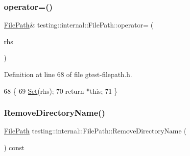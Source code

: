 \mbox{\label{classtesting_1_1internal_1_1FilePath_a8d9c1bafb90f10bcd5611a54d8f326ef}} 
\subsubsection{\texorpdfstring{operator=()}{operator=()}}
{\footnotesize\ttfamily \hyperlink{classtesting_1_1internal_1_1FilePath}{File\+Path}\& testing\+::internal\+::\+File\+Path\+::operator= (\begin{DoxyParamCaption}\item[{const \hyperlink{classtesting_1_1internal_1_1FilePath}{File\+Path} \&}]{rhs }\end{DoxyParamCaption})\hspace{0.3cm}{\ttfamily [inline]}}



Definition at line 68 of file gtest-\/filepath.\+h.


\begin{DoxyCode}
68                                            \{
69     \hyperlink{classtesting_1_1internal_1_1FilePath_a15a42de7518e89254e0640dd9317d5f7}{Set}(rhs);
70     \textcolor{keywordflow}{return} *\textcolor{keyword}{this};
71   \}
\end{DoxyCode}
\mbox{\label{classtesting_1_1internal_1_1FilePath_a6b61ede2c81ecd870b8220c04aec3060}} 
\subsubsection{\texorpdfstring{Remove\+Directory\+Name()}{RemoveDirectoryName()}}
{\footnotesize\ttfamily \hyperlink{classtesting_1_1internal_1_1FilePath}{File\+Path} testing\+::internal\+::\+File\+Path\+::\+Remove\+Directory\+Name (\begin{DoxyParamCaption}{ }\end{DoxyParamCaption}) const}



